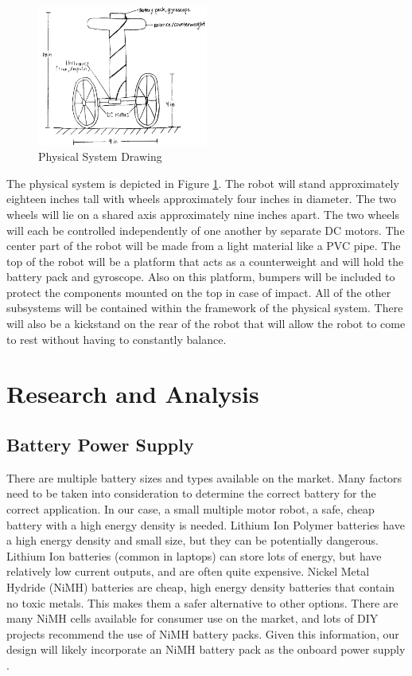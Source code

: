 \documentclass[11pt]{report}
\begin{document}
\begin{spacing}{1.5}
\begin{figure}[H]
    \centering
    \includegraphics[width=0.5\textwidth]{PhysicalSystem}
    \caption{Physical System Drawing}
    \label{PhysicalSystem}
\end{figure}

The physical system is depicted in Figure \ref{PhysicalSystem}.  The robot will stand approximately eighteen inches tall with wheels approximately four inches in diameter.  The two wheels will lie on a shared axis approximately nine inches apart.  The two wheels will each be controlled independently of one another by separate DC motors.  The center part of the robot will be made from a light material like a PVC pipe.  The top of the robot will be a platform that acts as a counterweight and will hold the battery pack and gyroscope.  Also on this platform, bumpers will be included to protect the components mounted on the top in case of impact.  All of the other subsystems will be contained within the framework of the physical system.  There will also be a kickstand on the rear of the robot that will allow the robot to come to rest without having to constantly balance.  


\section*{Research and Analysis} %

\subsection*{Battery Power Supply}

There are multiple battery sizes and types available on the market. Many factors need to be taken into consideration to determine the correct battery for the correct application. In our case, a small multiple motor robot, a safe, cheap battery with a high energy density is needed. Lithium Ion Polymer batteries have a high energy density and small size, but they can be potentially dangerous. Lithium Ion batteries (common in laptops) can store lots of energy, but have relatively low current outputs, and are often quite expensive. Nickel Metal Hydride (NiMH) batteries are cheap, high energy density batteries that contain no toxic metals. This makes them a safer alternative to other options. There are many NiMH cells available for consumer use on the market, and lots of DIY projects recommend the use of NiMH battery packs. Given this information, our design will likely incorporate an NiMH battery pack as the onboard power supply \cite{Calin}.


\end{spacing}
\end{document}
